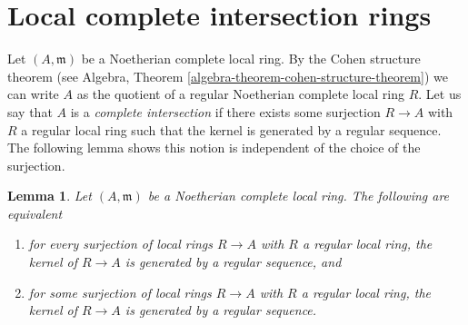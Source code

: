 \documentclass{stacks-project}
\theoremstyle{plain}
\newtheorem{lemma}[subsection]{Lemma}
\theoremstyle{definition}
\theoremstyle{remark}
\numberwithin{equation}{subsection}
\begin{document}
\section{Local complete intersection rings}
\label{section-lci}

\noindent
Let $(A, \mathfrak m)$ be a Noetherian complete local ring.
By the Cohen structure theorem (see
Algebra, Theorem \ref{algebra-theorem-cohen-structure-theorem})
we can write $A$ as the quotient of a regular Noetherian
complete local ring $R$. Let us say that $A$ is a
{\it complete intersection}
if there exists some surjection $R \to A$
with $R$ a regular local ring such that the kernel
is generated by a regular sequence.
The following lemma shows this notion is independent of
the choice of the surjection.

\begin{lemma}
\label{lemma-ci-well-defined}
Let $(A, \mathfrak m)$ be a Noetherian complete local ring.
The following are equivalent
\begin{enumerate}
\item for every surjection of local rings $R \to A$ with $R$
a regular local ring, the kernel of $R \to A$ is generated
by a regular sequence, and
\item for some surjection of local rings $R \to A$ with $R$
a regular local ring, the kernel of $R \to A$ is generated
by a regular sequence.
\end{enumerate}
\end{lemma}
\end{document}
